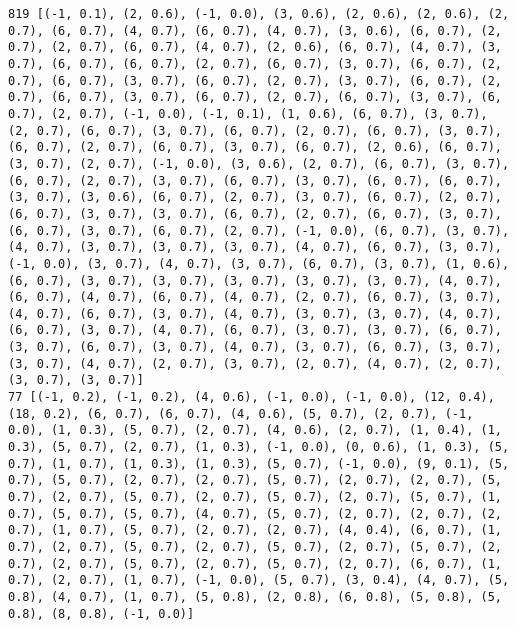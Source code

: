 \documentclass[11pt]{article}
\begin{document}
    \begin{Verbatim}[commandchars=\\\{\}]
819 [(-1, 0.1), (2, 0.6), (-1, 0.0), (3, 0.6), (2, 0.6), (2, 0.6), (2, 0.7), (6, 0.7), (4, 0.7), (6, 0.7), (4, 0.7), (3, 0.6), (6, 0.7), (2, 0.7), (2, 0.7), (6, 0.7), (4, 0.7), (2, 0.6), (6, 0.7), (4, 0.7), (3, 0.7), (6, 0.7), (6, 0.7), (2, 0.7), (6, 0.7), (3, 0.7), (6, 0.7), (2, 0.7), (6, 0.7), (3, 0.7), (6, 0.7), (2, 0.7), (3, 0.7), (6, 0.7), (2, 0.7), (6, 0.7), (3, 0.7), (6, 0.7), (2, 0.7), (6, 0.7), (3, 0.7), (6, 0.7), (2, 0.7), (-1, 0.0), (-1, 0.1), (1, 0.6), (6, 0.7), (3, 0.7), (2, 0.7), (6, 0.7), (3, 0.7), (6, 0.7), (2, 0.7), (6, 0.7), (3, 0.7), (6, 0.7), (2, 0.7), (6, 0.7), (3, 0.7), (6, 0.7), (2, 0.6), (6, 0.7), (3, 0.7), (2, 0.7), (-1, 0.0), (3, 0.6), (2, 0.7), (6, 0.7), (3, 0.7), (6, 0.7), (2, 0.7), (3, 0.7), (6, 0.7), (3, 0.7), (6, 0.7), (6, 0.7), (3, 0.7), (3, 0.6), (6, 0.7), (2, 0.7), (3, 0.7), (6, 0.7), (2, 0.7), (6, 0.7), (3, 0.7), (3, 0.7), (6, 0.7), (2, 0.7), (6, 0.7), (3, 0.7), (6, 0.7), (3, 0.7), (6, 0.7), (2, 0.7), (-1, 0.0), (6, 0.7), (3, 0.7), (4, 0.7), (3, 0.7), (3, 0.7), (3, 0.7), (4, 0.7), (6, 0.7), (3, 0.7), (-1, 0.0), (3, 0.7), (4, 0.7), (3, 0.7), (6, 0.7), (3, 0.7), (1, 0.6), (6, 0.7), (3, 0.7), (3, 0.7), (3, 0.7), (3, 0.7), (3, 0.7), (4, 0.7), (6, 0.7), (4, 0.7), (6, 0.7), (4, 0.7), (2, 0.7), (6, 0.7), (3, 0.7), (4, 0.7), (6, 0.7), (3, 0.7), (4, 0.7), (3, 0.7), (3, 0.7), (4, 0.7), (6, 0.7), (3, 0.7), (4, 0.7), (6, 0.7), (3, 0.7), (3, 0.7), (6, 0.7), (3, 0.7), (6, 0.7), (3, 0.7), (4, 0.7), (3, 0.7), (6, 0.7), (3, 0.7), (3, 0.7), (4, 0.7), (2, 0.7), (3, 0.7), (2, 0.7), (4, 0.7), (2, 0.7), (3, 0.7), (3, 0.7)]
77 [(-1, 0.2), (-1, 0.2), (4, 0.6), (-1, 0.0), (-1, 0.0), (12, 0.4), (18, 0.2), (6, 0.7), (6, 0.7), (4, 0.6), (5, 0.7), (2, 0.7), (-1, 0.0), (1, 0.3), (5, 0.7), (2, 0.7), (4, 0.6), (2, 0.7), (1, 0.4), (1, 0.3), (5, 0.7), (2, 0.7), (1, 0.3), (-1, 0.0), (0, 0.6), (1, 0.3), (5, 0.7), (1, 0.7), (1, 0.3), (1, 0.3), (5, 0.7), (-1, 0.0), (9, 0.1), (5, 0.7), (5, 0.7), (2, 0.7), (2, 0.7), (5, 0.7), (2, 0.7), (2, 0.7), (5, 0.7), (2, 0.7), (5, 0.7), (2, 0.7), (5, 0.7), (2, 0.7), (5, 0.7), (1, 0.7), (5, 0.7), (5, 0.7), (4, 0.7), (5, 0.7), (2, 0.7), (2, 0.7), (2, 0.7), (1, 0.7), (5, 0.7), (2, 0.7), (2, 0.7), (4, 0.4), (6, 0.7), (1, 0.7), (2, 0.7), (5, 0.7), (2, 0.7), (5, 0.7), (2, 0.7), (5, 0.7), (2, 0.7), (2, 0.7), (5, 0.7), (2, 0.7), (5, 0.7), (2, 0.7), (6, 0.7), (1, 0.7), (2, 0.7), (1, 0.7), (-1, 0.0), (5, 0.7), (3, 0.4), (4, 0.7), (5, 0.8), (4, 0.7), (1, 0.7), (5, 0.8), (2, 0.8), (6, 0.8), (5, 0.8), (5, 0.8), (8, 0.8), (-1, 0.0)]

\end{Verbatim}
\end{document}
